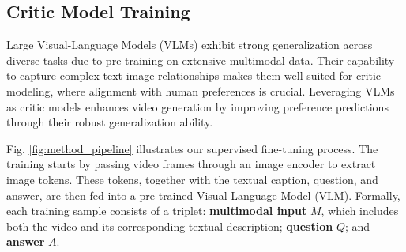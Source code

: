 \subsection{Critic Model Training}

Large Visual-Language Models (VLMs) exhibit strong generalization across diverse tasks due to pre-training on extensive multimodal data. Their capability to capture complex text-image relationships makes them well-suited for critic modeling, where alignment with human preferences is crucial. Leveraging VLMs as critic models enhances video generation by improving preference predictions through their robust generalization ability.




Fig. \ref{fig:method_pipeline} illustrates our supervised fine-tuning process. The training starts by passing video frames through an image encoder to extract image tokens. These tokens, together with the textual caption, question, and answer, are then fed into a pre-trained Visual-Language Model (VLM). Formally, each training sample consists of a triplet: \textbf{multimodal input} $M$, which includes both the video and its corresponding textual description; \textbf{question} $Q$; and \textbf{answer} $A$.


